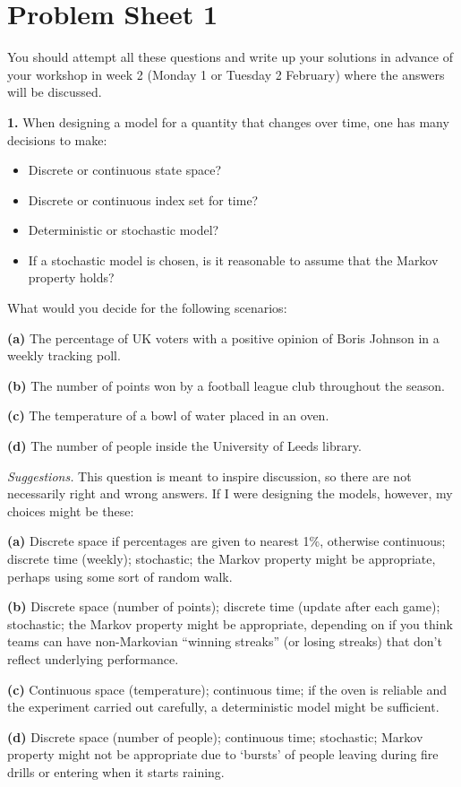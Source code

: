 \documentclass[
  a4paper,
]{article}
\providecommand{\tightlist}{%
  \setlength{\itemsep}{0pt}\setlength{\parskip}{0pt}}
\newif\ifcomm\commtrue
\theoremstyle{definition}
\theoremstyle{definition}
\theoremstyle{definition}
\theoremstyle{remark}
\begin{document}
\hypertarget{P01}{%
\section*{Problem Sheet 1}\label{P01}}

\commtrue

You should attempt all these questions and write up your solutions in advance of your workshop in week 2 (Monday 1 or Tuesday 2 February) where the answers will be discussed.

\textbf{1.} When designing a model for a quantity that changes over time, one has many decisions to make:

\begin{itemize}
\tightlist
\item
  Discrete or continuous state space?
\item
  Discrete or continuous index set for time?
\item
  Deterministic or stochastic model?
\item
  If a stochastic model is chosen, is it reasonable to assume that the Markov property holds?
\end{itemize}

What would you decide for the following scenarios:

\textbf{(a)} The percentage of UK voters with a positive opinion of Boris Johnson in a weekly tracking poll.

\textbf{(b)} The number of points won by a football league club throughout the season.

\textbf{(c)} The temperature of a bowl of water placed in an oven.

\textbf{(d)} The number of people inside the University of Leeds library.

\begin{myanswers}

\emph{Suggestions.} This question is meant to inspire discussion, so there are not necessarily right and wrong answers. If I were designing the models, however, my choices might be these:

\textbf{(a)} Discrete space if percentages are given to nearest 1\%, otherwise continuous; discrete time (weekly); stochastic; the Markov property might be appropriate, perhaps using some sort of random walk.

\textbf{(b)} Discrete space (number of points); discrete time (update after each game); stochastic; the Markov property might be appropriate, depending on if you think teams can have non-Markovian ``winning streaks'' (or losing streaks) that don't reflect underlying performance.

\textbf{(c)} Continuous space (temperature); continuous time; if the oven is reliable and the experiment carried out carefully, a deterministic model might be sufficient.

\textbf{(d)} Discrete space (number of people); continuous time; stochastic; Markov property might not be appropriate due to `bursts' of people leaving during fire drills or entering when it starts raining.

\end{myanswers}
\end{document}
